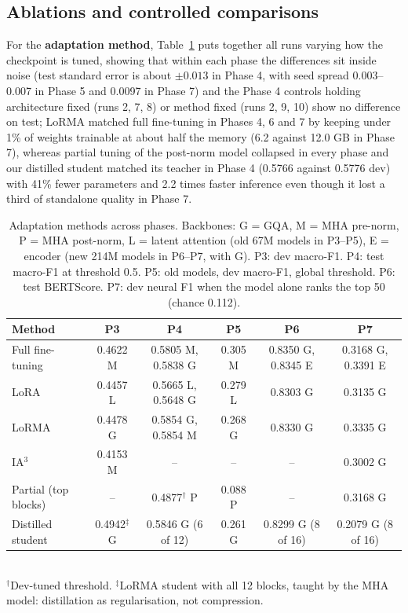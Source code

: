 \documentclass[11pt, oneside]{article}
\begin{document}
\subsection{Ablations and controlled comparisons}\label{sec:ablations}
For the \textbf{adaptation method}, Table~\ref{tab:methods} puts together all runs varying how the checkpoint is tuned, showing that within each phase the differences sit inside noise (test standard error is about $\pm0.013$ in Phase 4, with seed spread 0.003--0.007 in Phase 5 and 0.0097 in Phase 7) and the Phase 4 controls holding architecture fixed (runs 2, 7, 8) or method fixed (runs 2, 9, 10) show no difference on test; LoRMA matched full fine-tuning in Phases 4, 6 and 7 by keeping under 1\% of weights trainable at about half the memory (6.2 against 12.0 GB in Phase 7), whereas partial tuning of the post-norm model collapsed in every phase and our distilled student matched its teacher in Phase 4 (0.5766 against 0.5776 dev) with 41\% fewer parameters and 2.2 times faster inference even though it lost a third of standalone quality in Phase 7.

\begin{table}[H]
\centering\footnotesize
\setlength{\tabcolsep}{4pt}
\caption{Adaptation methods across phases. Backbones: G = GQA, M = MHA pre-norm, P = MHA post-norm, L = latent attention (old 67M models in P3--P5), E = encoder (new 214M models in P6--P7, with G). P3: dev macro-F1. P4: test macro-F1 at threshold 0.5. P5: old models, dev macro-F1, global threshold. P6: test BERTScore. P7: dev neural F1 when the model alone ranks the top 50 (chance 0.112).}
\label{tab:methods}
\begin{tabular}{lccccc}
\toprule
Method & P3 & P4 & P5 & P6 & P7 \\
\midrule
Full fine-tuning & 0.4622 M & 0.5805 M, 0.5838 G & 0.305 M & 0.8350 G, 0.8345 E & 0.3168 G, 0.3391 E \\
LoRA & 0.4457 L & 0.5665 L, 0.5648 G & 0.279 L & 0.8303 G & 0.3135 G \\
LoRMA & 0.4478 G & 0.5854 G, 0.5854 M & 0.268 G & 0.8330 G & 0.3335 G \\
IA$^3$ & 0.4153 M & -- & -- & -- & 0.3002 G \\
Partial (top blocks) & -- & 0.4877$^\dagger$ P & 0.088 P & -- & 0.3168 G \\
Distilled student & 0.4942$^\ddagger$ G & 0.5846 G (6 of 12) & 0.261 G & 0.8299 G (8 of 16) & 0.2079 G (8 of 16) \\
\bottomrule
\end{tabular}
\\[2pt]{\footnotesize $^\dagger$Dev-tuned threshold. $^\ddagger$LoRMA student with all 12 blocks, taught by the MHA model: distillation as regularisation, not compression.}
\end{table}
\end{document}

